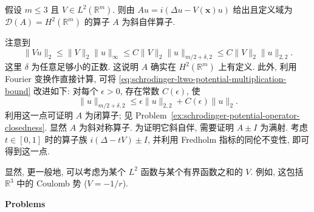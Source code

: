 \begin{Theorem}
\label{thm:schrodinger-ltwo-potential-skew-adjointness}
假设 $m\leq3$ 且 $V\in L^2(\mathbb{R}^m)$. 则由 $Au=i(\Delta u-V(\bm{x})u)$ 给出且定义域为 $\mathcal{D}(A)=H^2(\mathbb{R}^m)$ 的算子 $A$ 为斜自伴算子.
\end{Theorem}

\begin{Proof}
注意到
\begin{equation}\label{eq:schrodinger-ltwo-potential-multiplication-bound}
\|Vu\|_2\leq\|V\|_2\|u\|_\infty\leq C\|V\|_2\|u\|_{m/2+\delta,2}\leq C\|V\|_2\|u\|_{2,2}.
\end{equation}
这里 $\delta$ 为任意足够小的正数. 这说明 $A$ 确实在 $H^2(\mathbb{R}^m)$ 上有定义. 此外, 利用 Fourier 变换作直接计算, 可将 \eqref{eq:schrodinger-ltwo-potential-multiplication-bound} 改进如下: 对每个 $\epsilon>0$, 存在常数 $C(\epsilon)$, 使
\begin{equation}\label{eq:schrodinger-potential-small-relative-interpolation-bound}
\|u\|_{m/2+\delta,2}\leq\epsilon\|u\|_{2,2}+C(\epsilon)\|u\|_2.
\end{equation}
利用这一点可证明 $A$ 为闭算子; 见 Problem~\ref{ex:schrodinger-potential-operator-closedness}. 显然 $A$ 为斜对称算子. 为证明它斜自伴, 需要证明 $A\pm I$ 为满射. 考虑 $t\in[0,1]$ 时的算子族 $i(\Delta-tV)\pm I$, 并利用 Fredholm 指标的同伦不变性, 即可得到这一点.
\end{Proof}

显然, 更一般地, 可以考虑为某个 $L^2$ 函数与某个有界函数之和的 $V$. 例如, 这包括 $\mathbb{R}^3$ 中的 Coulomb 势 ($V=-1/r$).

\textbf{Problems}

